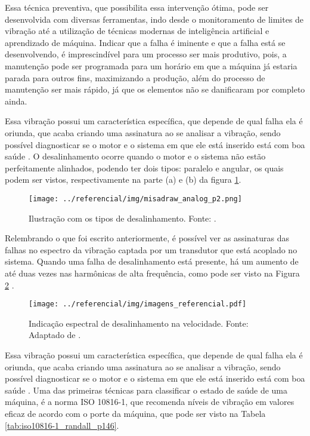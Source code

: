 \documentclass[a4paper]{ifacconf}
\begin{document}
Essa técnica preventiva, que possibilita essa intervenção ótima, pode ser desenvolvida com diversas ferramentas, indo desde o monitoramento
de limites de vibração até a utilização de técnicas modernas de inteligência artificial e aprendizado de máquina. Indicar que a falha é
iminente e que a falha está se desenvolvendo, é imprescindível para um processo ser mais produtivo, pois, a manutenção pode ser programada
para um horário em que a máquina já estaria parada para outros fins, maximizando a produção, além do processo de manutenção ser mais rápido, 
já que os elementos não se danificaram por completo ainda.

Essa vibração possui um característica específica, que depende de qual falha ela é oriunda, que acaba criando uma assinatura
ao se analisar a vibração, sendo possível diagnosticar se o motor e o sistema em que ele está inserido está com boa saúde \cite{Wu2013}.
O desalinhamento ocorre quando o motor e o sistema não estão perfeitamente alinhados, podendo ter dois tipos: paralelo e angular, os quais 
podem ser vistos, respectivamente na parte (a) e (b) da figura \ref{fig:misadraw_analog_p2}.

\begin{figure}[H]
  \begin{center}
      \texttt{[image: ../referencial/img/misadraw\_analog\_p2.png]}
  \end{center}
  \caption{Ilustração com os tipos de desalinhamento. Fonte: \cite{Sopcik2019}.}
  \label{fig:misadraw_analog_p2}
\end{figure}

Relembrando o que foi escrito anteriormente, é possível ver as assinaturas das falhas no espectro da vibração captada por um transdutor
que está acoplado no sistema. Quando uma falha de desalinhamento está presente, há um aumento de até duas vezes nas harmônicas de alta 
frequência, como pode ser visto na Figura \ref{fig:misa_analog_p2} \cite{Sopcik2019}.

\begin{figure}[H]
  \begin{center}
      \texttt{[image: ../referencial/img/imagens\_referencial.pdf]}
  \end{center}
  \caption{Indicação espectral de desalinhamento na velocidade. Fonte: Adaptado de \cite{Sopcik2019}.}
  \label{fig:misa_analog_p2}
\end{figure}

Essa vibração possui um característica específica, que depende de qual falha ela é oriunda, que acaba criando uma assinatura
ao se analisar a vibração, sendo possível diagnosticar se o motor e o sistema em que ele está inserido está com boa saúde \cite{Wu2013}.
Uma das primeiras técnicas para classificar o estado de saúde de uma máquina, é a norma ISO 10816-1, que recomenda níveis de vibração 
em valores eficaz de acordo com o porte da máquina, que pode ser visto na Tabela \ref{tab:iso10816-1_randall_p146}.
\end{document}
